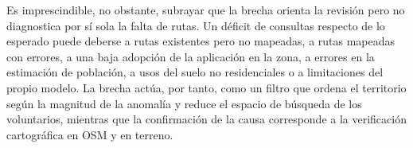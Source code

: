 Es imprescindible, no obstante, subrayar que la brecha orienta la revisión pero no
diagnostica por sí sola la falta de rutas. Un déficit de consultas respecto de lo esperado
puede deberse a rutas existentes pero no mapeadas, a rutas mapeadas con errores, a una baja
adopción de la aplicación en la zona, a errores en la estimación de población, a usos del
suelo no residenciales o a limitaciones del propio modelo. La brecha actúa, por tanto, como
un filtro que ordena el territorio según la magnitud de la anomalía y reduce el espacio de
búsqueda de los voluntarios, mientras que la confirmación de la causa corresponde a la
verificación cartográfica en OSM y en terreno.
